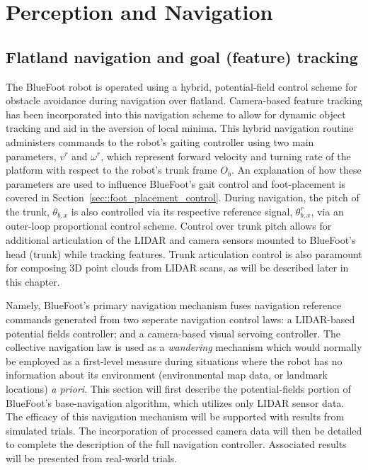\chapter{Perception and Navigation}
\label{ch::navigation}


	\section{Flatland navigation and goal (feature) tracking}
	
		The BlueFoot robot is operated using a hybrid, potential-field control scheme for obstacle avoidance during navigation over flatland. Camera-based feature tracking has been incorporated into this navigation scheme to allow for dynamic object tracking and aid in the aversion of local minima. This hybrid navigation routine administers commands to the robot's gaiting controller using two main parameters, $v^{r}$ and $\omega^{r}$, which represent forward velocity and turning rate of the platform with respect to the robot's trunk frame $O_{b}$. An explanation of how these parameters are used to influence BlueFoot's gait control and foot-placement is covered in Section~\ref{sec::foot_placement_control}. During navigation, the pitch of the trunk, $\theta_{b,x}$ is also controlled via its respective reference signal, $\theta_{b,x}^{r}$, via an outer-loop proportional control scheme. Control over trunk pitch allows for additional articulation of the LIDAR and camera sensors mounted to BlueFoot's head (trunk) while tracking features. Trunk articulation control is also paramount for composing 3D point clouds from LIDAR scans, as will be described later in this chapter.

		Namely, BlueFoot's primary navigation mechanism fuses navigation reference commands generated from two seperate navigation control laws: a LIDAR-based potential fields controller; and a camera-based visual servoing controller. The collective navigation law is used as a \emph{wandering} mechanism which would normally be employed as a first-level measure during situations where the robot has no information about its environment (\IE environmental map data, or landmark locations) \emph{a priori}. This section will first describe the potential-fields portion of BlueFoot's base-navigation algorithm, which utilizes only LIDAR sensor data. The efficacy of this navigation mechanism will be supported with results from simulated trials. The incorporation of processed camera data will then be detailed to complete the description of the full navigation controller. Associated results will be presented from real-world trials.


